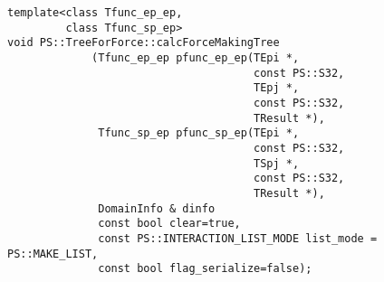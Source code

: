 \begin{screen}
\begin{verbatim}
template<class Tfunc_ep_ep,
         class Tfunc_sp_ep>
void PS::TreeForForce::calcForceMakingTree
             (Tfunc_ep_ep pfunc_ep_ep(TEpi *,
                                      const PS::S32,
                                      TEpj *,
                                      const PS::S32,
                                      TResult *),
              Tfunc_sp_ep pfunc_sp_ep(TEpi *,
                                      const PS::S32,
                                      TSpj *,
                                      const PS::S32,
                                      TResult *),
              DomainInfo & dinfo
              const bool clear=true,
              const PS::INTERACTION_LIST_MODE list_mode = PS::MAKE_LIST,
              const bool flag_serialize=false);
\end{verbatim}
\end{screen}

